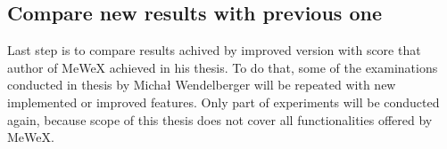 \subsection{Compare new results with previous one}
Last step is to compare results achived by improved version with score that author of MeWeX achieved in his thesis.
To do that, some of the examinations conducted in thesis by Michał Wendelberger will be repeated with new implemented or improved features. 
Only part of experiments will be conducted again, because scope of this thesis does not cover all functionalities offered by MeWeX.